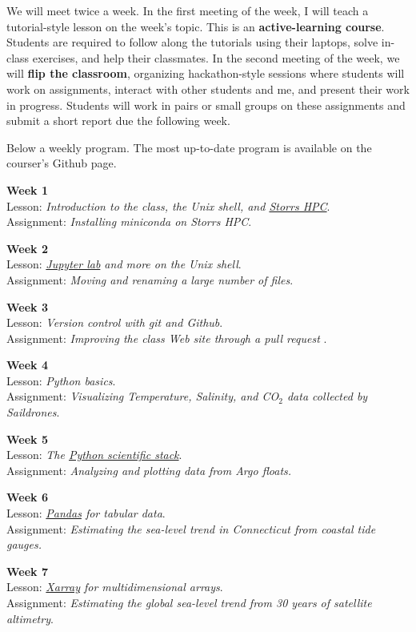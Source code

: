 \documentclass[11pt]{article}
\begin{document}
We will meet twice a week. In the first meeting of the week, I will teach a tutorial-style lesson on the week's topic. This is an \textbf{active-learning course}. Students are required to follow along the tutorials using their laptops, solve in-class exercises, and help their classmates. In the second meeting of the week, we will \textbf{flip the classroom}, organizing hackathon-style sessions where students will work on assignments, interact with other students and me, and present their work in progress.   Students will work in pairs or small groups on these assignments and submit a short report due the following week. 

Below a weekly program. The most up-to-date program is available on the courser's Github page.

\textbf{Week 1}\\
 Lesson: \textit{Introduction to the class, the Unix shell, and \href{https://hpc.uconn.edu/}{Storrs HPC}}.\\
 Assignment: \textit{Installing miniconda on Storrs HPC}.

\textbf{Week 2}\\
 Lesson: \textit{\href{https://jupyter.org}{Jupyter lab} and more on the Unix shell}.\\
 Assignment: \textit{Moving and renaming a large number of files}.

\textbf{Week 3} \\
Lesson: \textit{Version control with git and Github}.\\
Assignment:  \textit{Improving the class Web site through a pull request  }.

\textbf{Week 4}\\
 Lesson: \textit{Python basics}.\\
 Assignment: \textit{Visualizing Temperature, Salinity, and CO$_2$  data collected by Saildrones}.
 
 \textbf{Week 5}\\
 Lesson: \textit{The \href{https://www.scipy.org/about.html}{Python scientific stack}}.\\
 Assignment: \textit{Analyzing and plotting data from Argo floats.}
 
\textbf{Week 6}\\
 Lesson: \textit{\href{https://pandas.pydata.org}{Pandas} for tabular data}.\\
 Assignment: \textit{Estimating the sea-level trend in Connecticut from coastal tide gauges.}

\textbf{Week 7}\\
 Lesson: \textit{\href{http://xarray.pydata.org/en/stable/}{Xarray} for multidimensional arrays}.\\
 Assignment: \textit{Estimating the global sea-level trend  from  30 years  of satellite altimetry}.
\end{document}
